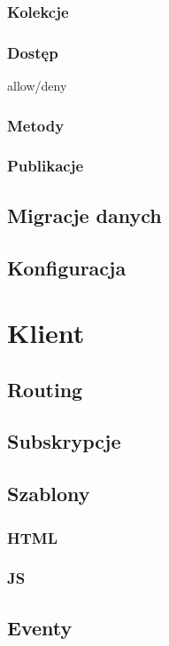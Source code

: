   \subsubsection{Kolekcje}
  
  \subsubsection{Dostęp}
   allow/deny
   \subsubsection{Metody}
   \subsubsection{Publikacje}
  \subsection{Migracje danych}
  \subsection{Konfiguracja}



\section{Klient}
  \subsection{Routing}
  \subsection{Subskrypcje}
  \subsection{Szablony}
    \subsubsection{HTML}
    \subsubsection{JS}
  \subsection{Eventy}
